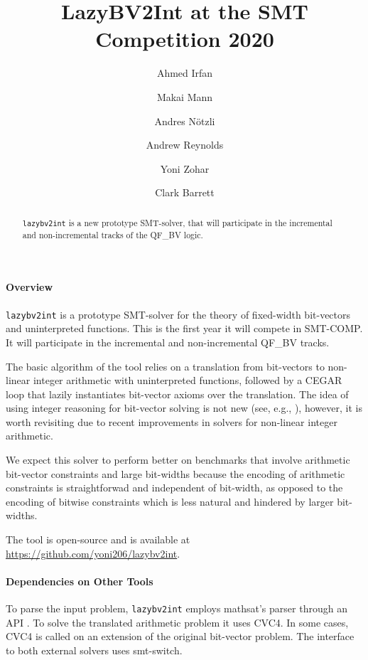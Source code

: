 \documentclass{easychair}
\newcommand{\lazybvtoint}{\texttt{lazybv2int}\xspace}
\newcommand{\smtcomp}{SMT-COMP\xspace}
\newcommand{\qfbv}{QF\_BV\xspace}
\newcommand{\msat}{mathsat\xspace}
\newcommand{\cvcfour}{CVC4\xspace}
\newcommand{\smtswitch}{smt-switch\xspace}
\begin{document}
\author{
		Ahmed Irfan \and
		Makai Mann \and
		Andres N\"otzli \and
		Andrew Reynolds\and
		Yoni Zohar\and
		Clark Barrett
}

\title{LazyBV2Int at the SMT Competition 2020}

\maketitle


\noindent
\begin{abstract}
\lazybvtoint is a new prototype SMT-solver, that  will participate in the incremental and non-incremental tracks of the \qfbv logic.
\end{abstract}

\paragraph{Overview}
\lazybvtoint is a prototype SMT-solver for the theory of fixed-width bit-vectors and uninterpreted functions.
This is the first year it will compete in \smtcomp.
It will participate in the incremental and non-incremental \qfbv tracks.

The basic algorithm of the tool relies on a translation from bit-vectors to
non-linear integer arithmetic with uninterpreted functions, followed by
a CEGAR loop \cite{cegar} that lazily instantiates bit-vector axioms over the translation.
The idea of using integer reasoning for bit-vector solving is not new (see,
e.g., \cite{}), however, it is worth revisiting due to recent improvements in solvers for non-linear integer arithmetic.

We expect this solver to perform better on benchmarks that involve arithmetic
bit-vector constraints and large bit-widths because the encoding of arithmetic
constraints is straightforwad and independent of bit-width, as opposed to the
encoding of bitwise constraints which is less natural and hindered by larger
bit-widths.

The tool is open-source and is available at \url{https://github.com/yoni206/lazybv2int}.

\paragraph{Dependencies on Other Tools}
%
To parse the input problem, \lazybvtoint employs \msat's
parser through an API \cite{mathsat5}.
To solve the translated arithmetic problem it uses \cvcfour \cite{cvc4}.
In some cases, \cvcfour is called on an extension of the original bit-vector problem.
%
The interface to both external solvers uses
\smtswitch \cite{smtswitchgithub}.
\end{document}
